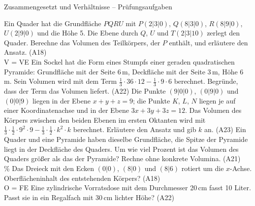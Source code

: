 \begin{aufgabe}{Zusammengesetzt und Verhältnisse – Prüfungsaufgaben}
\begin{teile}
\teil Ein Quader hat die Grundfläche $PQRU$ mit $P(2 | 3 | 0)$, $Q(8 | 3 | 0)$, $R(8 | 9 | 0)$, $U(2 | 9 | 0)$ und die Höhe 5. Die Ebene durch $Q$, $U$ und $T(2 | 3 | 10)$ zerlegt den Quader. Berechne das Volumen des Teilkörpers, der $P$ enthält, und erläutere den Ansatz. \hfill (A18) \\ V = \leerfeld VE
\teil Ein Sockel hat die Form eines Stumpfs einer geraden quadratischen Pyramide: Grundfläche mit der Seite 6\,m, Deckfläche mit der Seite 3\,m, Höhe 6\,m. Sein Volumen wird mit dem Term $\tfrac{1}{3} \cdot 36 \cdot 12 - \tfrac{1}{3} \cdot 9 \cdot 6$ berechnet. Begründe, dass der Term das Volumen liefert. \hfill (A22)
\teil Die Punkte $(9 | 0 | 0)$, $(0 | 9 | 0)$ und $(0 | 0 | 9)$ liegen in der Ebene $x + y + z = 9$; die Punkte $K$, $L$, $N$ liegen je auf einer Koordinatenachse und in der Ebene $3x + 3y + 3z = 12$. Das Volumen des Körpers zwischen den beiden Ebenen im ersten Oktanten wird mit $\tfrac{1}{3} \cdot \tfrac{1}{2} \cdot 9^2 \cdot 9 - \tfrac{1}{3} \cdot \tfrac{1}{2} \cdot k^2 \cdot k$ berechnet. Erläutere den Ansatz und gib $k$ an. \hfill (A23)
\teil Ein Quader und eine Pyramide haben dieselbe Grundfläche, die Spitze der Pyramide liegt in der Deckfläche des Quaders. Um wie viel Prozent ist das Volumen des Quaders größer als das der Pyramide? Rechne ohne konkrete Volumina. \hfill (A21) \\ \leerfeld \%
\teil Das Dreieck mit den Ecken $(0 | 0)$, $(8 | 0)$ und $(8 | 6)$ rotiert um die $x$-Achse. Oberflächeninhalt des entstehenden Körpers? \hfill (A18) \\ O = \leerfeld FE
\teil Eine zylindrische Vorratsdose mit dem Durchmesser 20\,cm fasst 10 Liter. Passt sie in ein Regalfach mit 30\,cm lichter Höhe? \hfill (A22)
\end{teile}
\end{aufgabe}

